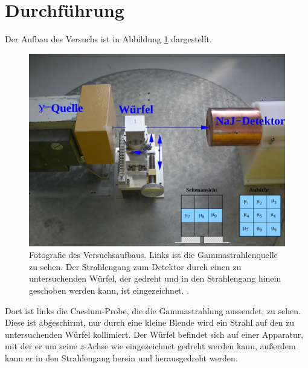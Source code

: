\section{Durchführung}
\label{sec:Durchführung}

Der Aufbau des Versuchs ist in Abbildung \ref{fig:aufbau} dargestellt.

\begin{figure}
  \centering
  \includegraphics[width=\textwidth]{images/aufbau.png}
  \caption{Fotografie des Versuchsaufbaus. Links ist die Gammastrahlenquelle zu sehen. Der Strahlengang zum Detektor durch einen zu untersuchenden Würfel, der gedreht und in den Strahlengang hinein geschoben werden kann, ist eingezeichnet. \cite{Versuchsanleitung}.}
  \label{fig:aufbau}
\end{figure}

Dort ist links die Caesium-Probe, die die Gammastrahlung aussendet, zu sehen. Diese ist abgeschirmt, nur durch eine kleine Blende wird ein Strahl auf den zu untersuchenden Würfel kollimiert. Der Würfel befindet sich auf einer Apparatur, mit der er um seine $z$-Achse wie eingezeichnet gedreht werden kann, außerdem kann er in den Strahlengang herein und herausgedreht werden.


